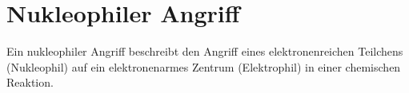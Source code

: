\section{Nukleophiler Angriff} \label{sec:nucleo_angriff}
Ein nukleophiler Angriff beschreibt den Angriff eines elektronenreichen Teilchens (Nukleophil) auf ein elektronenarmes Zentrum (Elektrophil) in einer chemischen Reaktion.
